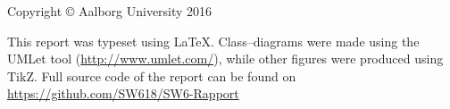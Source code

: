 \thispagestyle{empty}
{\small
\strut\vfill
\noindent Copyright \copyright{} Aalborg University 2016\par
\vspace{0.2cm}
\noindent %
This report was typeset using \LaTeX.
Class--diagrams were made using the UMLet tool (\url{http://www.umlet.com/}), while other figures were produced using TikZ.
Full source code of the report can be found on \url{https://github.com/SW618/SW6-Rapport}}
\clearpage
